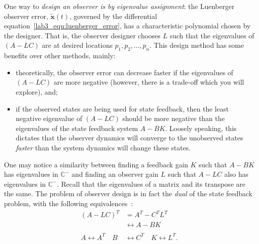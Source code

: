 \begin{enumerate}
\begin{enumerate}
                    One way to \emph{design an observer is by eigenvalue assignment}: the Luenberger observer error, $\tilde{\mathbf{x}}(t)$, governed by the differential equation~\eqref{lab3_equ:luenberger_error}, has a characteristic polynomial chosen by the designer. That is, the observer designer chooses $L$ such that the eigenvalues of $(A-LC)$ are at desired locations $p_1, p_2, \dots, p_n$. This design method has some benefits over other methods, mainly:
                    \begin{itemize}
                        \item theoretically, the observer error can decrease faster if the eigenvalues of $(A-LC)$ are more negative (however, there is a trade-off which you will explore), and;
                        \item if the observed states are being used for state feedback, then the least negative eigenvalue of $(A-LC)$ should be more negative than the eigenvalues of the state feedback system $A-BK$. Loosely speaking, this dictates that the observer dynamics will converge to the unobserved states \emph{faster} than the system dynamics will change these states.
                    \end{itemize}
                    One may notice a similarity between finding a feedback gain $K$ such that $A-BK$ has eigenvalues in $\mathbb{C}^-$ and finding an observer gain $L$ such that $A-LC$ also has eigenvalues in $\mathbb{C}^-$. Recall that the eigenvalues of a matrix and its transpose are the same. The problem of observer design is in fact the \emph{dual} of the state feedback problem, with the following equivalences~\cite{astrom2010feedback}:
                    \begin{align*}
                        (A-LC)^T                      & = A^T - C^T L^T                                  \\
                                                      & \leftrightarrow A - BK                           \\
                        \\
                        A \leftrightarrow A^T \quad B & \leftrightarrow C^T \quad K \leftrightarrow L^T.
                    \end{align*}


\end{enumerate}
\end{enumerate}
